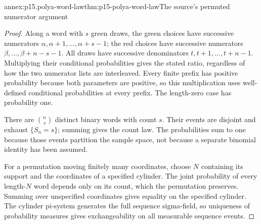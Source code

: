 \begin{annexitem}{annex:p15.polya-word-law}{thm:p15-polya-word-law}{The source's permuted numerator argument}
\begin{proof}
Along a word with \(s\) green draws, the green choices have successive
numerators \(\alpha,\alpha+1,\ldots,\alpha+s-1\);
the red choices have successive numerators
\(\beta,\ldots,\beta+n-s-1\).
All draws have successive denominators \(t,t+1,\ldots,t+n-1\).
Multiplying their conditional probabilities gives the stated ratio,
regardless of how the two numerator lists are interleaved.
Every finite prefix has positive probability because both parameters
are positive, so this multiplication uses well-defined conditional
probabilities at every prefix. The length-zero case has probability one.

There are \(\binom ns\) distinct binary words with count \(s\).
Their events are disjoint and exhaust \(\{S_n=s\}\); summing gives
the count law. The probabilities sum to one because those events
partition the sample space, not because a separate binomial identity
has been assumed.

For a permutation moving finitely many coordinates, choose \(N\)
containing its support and the coordinates of a specified cylinder.
The joint probability of every length-\(N\) word depends only on its
count, which the permutation preserves. Summing over unspecified
coordinates gives equality on the specified cylinder.
The cylinder pi-system generates the full sequence sigma-field,
so uniqueness of probability measures gives exchangeability on all
measurable sequence events.
\end{proof}
\end{annexitem}

